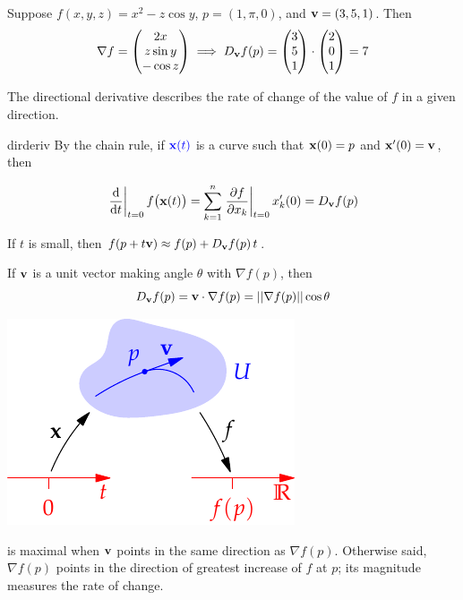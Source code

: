 \begin{example}{}{}
Suppose $f(x,y,z)=x^2-z\cos y$, $p=(1,\pi,0)$, and ${\mathbf{v}}=(3,5,1)$. Then
\[\nabla f=\begin{pmatrix}2x\\z\sin y\\-\cos z\end{pmatrix} \implies D_{\mathbf{v}} f(p)=\begin{pmatrix}3\\5\\1\end{pmatrix}\cdot\begin{pmatrix}2\\0\\1\end{pmatrix} =7\]
\end{example}

The directional derivative describes the rate of change of the value of $f$ in a given direction.

\begin{lemm}{}{dirderiv}
\exstart By the chain rule, if $\textcolor{blue}{{\mathbf{x}}(t)}$ is a curve such that ${\mathbf{x}}(0)=p$ and ${\mathbf{x}}'(0)={\mathbf{v}}$, then
\begin{enumerate}\setcounter{enumi}{1}
  \begin{minipage}[t]{0.6\linewidth}\vspace{-12pt}
  	\item[]
  \[
  	\diffat t{t=0}f\bigl(\vx(t)\bigr) =\sum_{k=1}^n\partialsat[f]{x_k}{t=0}x'_k(0) %
  	=D_\vv f(p)
  \]
	\item If $t$ is small, then $f(p+t{\mathbf{v}})\approx f(p)+D_{{\mathbf{v}}}f(p)\,t$.
  \item If ${\mathbf{v}}$ is a unit vector making angle $\theta$ with $\nabla f(p)$, then
  \[D_{{\mathbf{v}}}f(p)={\mathbf{v}}\cdot\nabla f(p)=\left| \left| \nabla f(p)\right|\right|\cos\theta\]
  \end{minipage}
  \hfill
  \begin{minipage}[t]{0.39\linewidth}\vspace{-8pt}
  	\flushright\includegraphics{forms-dderiv}
  \end{minipage}\smallbreak
   is maximal when ${\mathbf{v}}$ points in the same direction as $\nabla f(p)$. Otherwise said, $\nabla f(p)$ points in the direction of greatest increase of $f$ at $p$; its magnitude measures the rate of change.
\end{enumerate}
\end{lemm}


